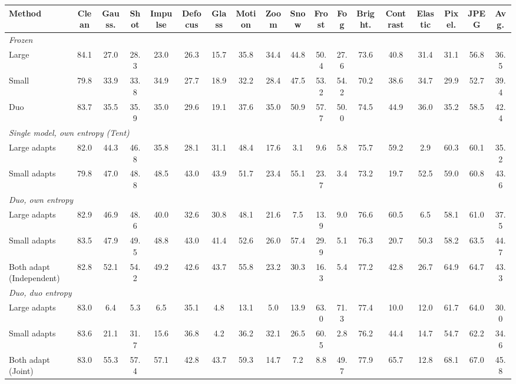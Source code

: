 \begin{table}[t]
{\begin{tabular}{l|c|ccc|cccc|cccc|cccc|c}
        \cmidrule(lr){3-5}\cmidrule(lr){6-9}\cmidrule(lr){10-13}\cmidrule(lr){14-17}
        Method & Clean & Gauss. & Shot & Impulse & Defocus & Glass & Motion & Zoom & Snow & Frost & Fog & Bright. & Contrast & Elastic & Pixel. & JPEG & Avg. \\
        \midrule
        \multicolumn{18}{l}{\textit{Frozen}} \\
        \quad Large & 84.1 & 27.0 & 28.3 & 23.0 & 26.3 & 15.7 & 35.8 & 34.4 & 44.8 & 50.4 & 27.6 & 73.6 & 40.8 & 31.4 & 31.1 & 56.8 & 36.5 \\
        \quad Small & 79.8 & 33.9 & 33.8 & 34.9 & 27.7 & 18.9 & 32.2 & 28.4 & 47.5 & 53.2 & 54.2 & 70.2 & 38.6 & 34.7 & 29.9 & 52.7 & 39.4 \\
        \quad Duo & 83.7 & 35.5 & 35.9 & 35.0 & 29.6 & 19.1 & 37.6 & 35.0 & 50.9 & 57.7 & 50.0 & 74.5 & 44.9 & 36.0 & 35.2 & 58.5 & 42.4 \\
        \midrule
        \multicolumn{18}{l}{\textit{Single model, own entropy (Tent)}} \\
        \quad Large adapts & 82.0 & 44.3 & 46.8 & 35.8 & 28.1 & 31.1 & 48.4 & 17.6 & 3.1 & 9.6 & 5.8 & 75.7 & 59.2 & 2.9 & 60.3 & 60.1 & 35.2 \\
        \quad Small adapts & 79.8 & 47.0 & 48.8 & 48.5 & 43.0 & 43.9 & 51.7 & 23.4 & 55.1 & 23.7 & 3.4 & 73.2 & 19.7 & 52.5 & 59.0 & 60.8 & 43.6 \\
        \midrule
        \multicolumn{18}{l}{\textit{Duo, own entropy}} \\
        \quad Large adapts & 82.9 & 46.9 & 48.6 & 40.0 & 32.6 & 30.8 & 48.1 & 21.6 & 7.5 & 13.9 & 9.0 & 76.6 & 60.5 & 6.5 & 58.1 & 61.0 & 37.5 \\
        \quad Small adapts & 83.5 & 47.9 & 49.5 & 48.8 & 43.0 & 41.4 & 52.6 & 26.0 & 57.4 & 29.9 & 5.1 & 76.3 & 20.7 & 50.3 & 58.2 & 63.5 & 44.7 \\
        \quad Both adapt (Independent) & 82.8 & 52.1 & 54.2 & 49.2 & 42.6 & 43.7 & 55.8 & 23.2 & 30.3 & 16.3 & 5.4 & 77.2 & 42.8 & 26.7 & 64.9 & 64.7 & 43.3 \\
        \midrule
        \multicolumn{18}{l}{\textit{Duo, duo entropy}} \\
        \quad Large adapts & 83.0 & 6.4 & 5.3 & 6.5 & 35.1 & 4.8 & 13.1 & 5.0 & 13.9 & 63.0 & 71.3 & 77.4 & 10.0 & 12.0 & 61.7 & 64.0 & 30.0 \\
        \quad Small adapts & 83.6 & 21.1 & 31.7 & 15.6 & 36.8 & 4.2 & 36.2 & 32.1 & 26.5 & 60.5 & 2.8 & 76.2 & 44.4 & 14.7 & 54.7 & 62.2 & 34.6 \\
        \quad Both adapt (Joint) & 83.0 & 55.3 & 57.4 & 57.1 & 42.8 & 43.7 & 59.3 & 14.7 & 7.2 & 8.8 & 49.7 & 77.9 & 65.7 & 12.8 & 68.1 & 67.0 & 45.8 \\
        \bottomrule
    \end{tabular}%
    }
\end{table}
